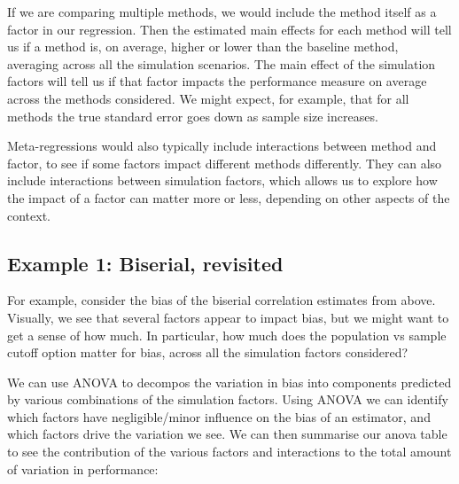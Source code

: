 \documentclass[
]{book}
\begin{document}
If we are comparing multiple methods, we would include the method itself as a factor in our regression.
Then the estimated main effects for each method will tell us if a method is, on average, higher or lower than the baseline method, averaging across all the simulation scenarios.
The main effect of the simulation factors will tell us if that factor impacts the performance measure on average across the methods considered.
We might expect, for example, that for all methods the true standard error goes down as sample size increases.

Meta-regressions would also typically include interactions between method and factor, to see if some factors impact different methods differently.
They can also include interactions between simulation factors, which allows us to explore how the impact of a factor can matter more or less, depending on other aspects of the context.

\subsection{Example 1: Biserial, revisited}\label{example-1-biserial-revisited}

For example, consider the bias of the biserial correlation estimates from above.
Visually, we see that several factors appear to impact bias, but we might want to get a sense of how much.
In particular, how much does the population vs sample cutoff option matter for bias, across all the simulation factors considered?

We can use ANOVA to decompos the variation in bias into components predicted by various combinations of the simulation factors.
Using ANOVA we can identify which factors have negligible/minor influence on the bias of an estimator, and which factors drive the variation we see.
We can then summarise our anova table to see the contribution of the various factors and interactions to the total amount of variation in performance:
\end{document}
